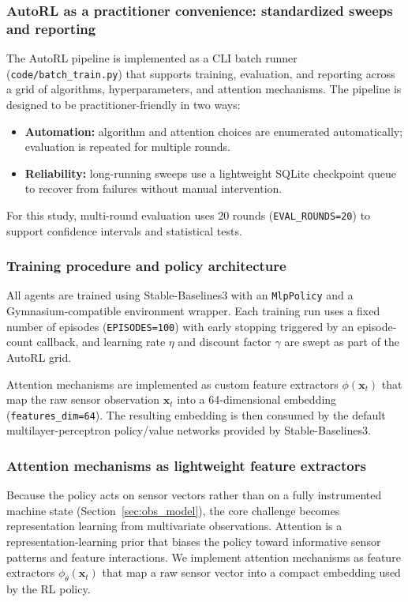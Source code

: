 \documentclass[sn-basic]{sn-jnl} %
\begin{document}
\subsubsection{AutoRL as a practitioner convenience: standardized sweeps and reporting}
\label{sec:autorl}
The AutoRL pipeline is implemented as a CLI batch runner (\texttt{code/batch\_train.py}) that supports training, evaluation, and reporting across a grid of algorithms, hyperparameters, and attention mechanisms. The pipeline is designed to be practitioner-friendly in two ways:
\begin{itemize}
        \item \textbf{Automation:} algorithm and attention choices are enumerated automatically; evaluation is repeated for multiple rounds.
        \item \textbf{Reliability:} long-running sweeps use a lightweight SQLite checkpoint queue to recover from failures without manual intervention.
\end{itemize}
For this study, multi-round evaluation uses 20 rounds (\texttt{EVAL\_ROUNDS=20}) to support confidence intervals and statistical tests.

\subsubsection{Training procedure and policy architecture}
All agents are trained using Stable-Baselines3 with an \texttt{MlpPolicy} and a Gymnasium-compatible environment wrapper. Each training run uses a fixed number of episodes (\texttt{EPISODES=100}) with early stopping triggered by an episode-count callback, and learning rate $\eta$ and discount factor $\gamma$ are swept as part of the AutoRL grid.

Attention mechanisms are implemented as custom feature extractors $\phi(\mathbf{x}_t)$ that map the raw sensor observation $\mathbf{x}_t$ into a 64-dimensional embedding (\texttt{features\_dim=64}). The resulting embedding is then consumed by the default multilayer-perceptron policy/value networks provided by Stable-Baselines3.

\subsubsection{Attention mechanisms as lightweight feature extractors}
\label{sec:attention}
Because the policy acts on sensor vectors rather than on a fully instrumented machine state (Section~\ref{sec:obs_model}), the core challenge becomes representation learning from multivariate observations. Attention is a representation-learning prior that biases the policy toward informative sensor patterns and feature interactions. We implement attention mechanisms as feature extractors $\phi_\theta(\mathbf{x}_t)$ that map a raw sensor vector into a compact embedding used by the RL policy.
\end{document}
